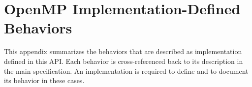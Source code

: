 %
%
%
%
%
%
%
%
%
%
%
%
%

\chapter{OpenMP Implementation-Defined Behaviors}
\label{chap:OpenMP Implementation-Defined Behaviors}
This appendix summarizes the behaviors that are described as implementation 
defined in this API. Each behavior is cross-referenced back to its description 
in the main specification. An implementation is required to define and to document 
its behavior in these cases.

